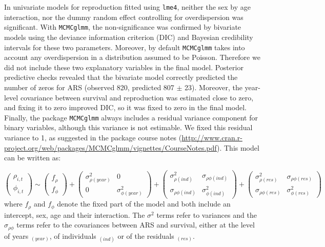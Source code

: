 In univariate models for reproduction fitted using \verb+lme4+, neither the sex by age interaction, nor the dummy random effect controlling for overdispersion was significant. With \verb+MCMCglmm+, the non-significance was confirmed by bivariate models using the deviance information criterion (DIC) and Bayesian credibility intervals for these two parameters. Moreover, by default \verb+MCMCglmm+ takes into account any overdispersion in a distribution assumed to be Poisson. Therefore we did not include these two explanatory variables in the final model. Posterior predictive checks revealed that the bivariate model correctly predicted the number of zeros for ARS (observed 820, predicted 807 $\pm$ 23). Moreover, the year-level covariance between survival and reproduction was estimated close to zero, and fixing it to zero improved DIC, so it was fixed to zero in the final model. Finally, the package \verb+MCMCglmm+ always includes a residual variance component for binary variables, although this variance is not estimable. We fixed this residual variance to 1, as suggested in the package course notes (\url{http://www.cran.r-project.org/web/packages/MCMCglmm/vignettes/CourseNotes.pdf}).
This model can be written as:

\begin{equation*}
	\begin{pmatrix}
	\rho_{i,t}\\
	\phi_{i,t}
		\end{pmatrix}
		\sim	
	\begin{pmatrix}
	f_{\rho}\\
	f_{\phi}
	\end{pmatrix}	
	+
	\begin{pmatrix}
	\sigma_{\rho (year)}^2 & 0\\
	0 & \sigma_{\phi (year)}^2
	\end{pmatrix}	
	+
	\begin{pmatrix}
	\sigma_{\rho (ind)}^2 & \sigma_{\rho \phi (ind)}\\
	\sigma_{\rho \phi (ind)} & \sigma_{\phi (ind)}^2
	\end{pmatrix}	
	+
	\begin{pmatrix}
	\sigma_{\rho (res)}^2 & \sigma_{\rho \phi (res)}\\
	\sigma_{\rho \phi (res)} & \sigma_{\phi (res)}^2
	\end{pmatrix}	
\end{equation*}
where $f_{\rho}$ and $f_{\phi}$ denote the fixed part of the model and both include an intercept, sex, age and their interaction. The $\sigma^2$ terms refer to variances and the $\sigma_{\rho \phi}$ terms refer to the covariances between ARS and survival, either at the level of years $_{(year)}$, of individuals $_{(ind)}$ or of the residuals $_{(res)}$.

